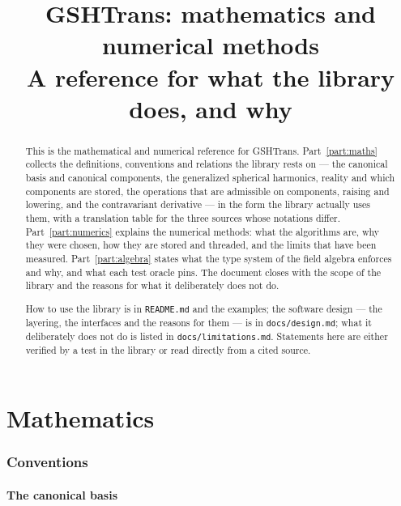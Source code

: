 \documentclass[11pt,a4paper]{article}
\title{GSHTrans: mathematics and numerical methods\\
\large A reference for what the library does, and why}
\author{}
\date{}
\newcommand{\code}[1]{\texttt{#1}}
\begin{document}
\maketitle

\begin{abstract}
This is the mathematical and numerical reference for GSHTrans.
Part~\ref{part:maths} collects the definitions, conventions and relations
the library rests on --- the canonical basis and canonical components, the
generalized spherical harmonics, reality and which components are stored,
the operations that are admissible on components, raising and lowering,
and the contravariant derivative --- in the form the library actually uses
them, with a translation table for the three sources whose notations
differ.  Part~\ref{part:numerics} explains the numerical methods: what the
algorithms are, why they were chosen, how they are stored and threaded,
and the limits that have been measured.  Part~\ref{part:algebra} states
what the type system of the field algebra enforces and why, and what each
test oracle pins.  The document closes with the scope of the library and
the reasons for what it deliberately does not do.

How to use the library is in \code{README.md} and the examples; the
software design --- the layering, the interfaces and the reasons for them
--- is in \code{docs/design.md}; what it deliberately does not do is
listed in \code{docs/limitations.md}.  Statements here are either verified by a test
in the library or read directly from a cited source.
\end{abstract}

\tableofcontents

\part{Mathematics}
\label{part:maths}

\section{Conventions}
\label{sec:conventions}

\subsection{The canonical basis}
\label{sec:basis}
\end{document}
